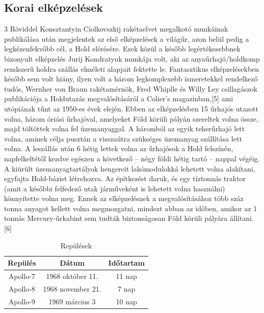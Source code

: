 \subsection{Korai elképzelések}
\begin{multicolss}{3} 
	Röviddel Konsztantyin Ciolkovszkij rakétaelvet megalkotó munkáinak publikálása után megjelentek az első elképzelések a világűr, azon belül pedig a legkézenfekvőbb cél, a Hold elérésére. Ezek közül a később legértékesebbnek bizonyult elképzelés Jurij Kondratyuk munkája volt, aki az 
	\columnbreak %
	anyaűrhajó/holdkomp rendszerű holdra szállás elméleti alapjait fektette le. Fantasztikus elképzelésekben később sem volt hiány, ilyen volt a három legkomplexebb ismeretekkel rendelkező tudós, Wernher von Braun rakétamérnök, Fred Whiplle és Willy Ley csillagászok publikációja a Holdutazás megvalósításáról a Colier's magazinban,[5] ami utópiának tűnt az 1950-es évek elején. Ebben az elképzelésben 15 űrhajós utazott volna, három óriási űrhajóval, amelyeket Föld körüli pályán szereltek volna össze, majd töltöttek volna fel üzemanyaggal. A háromból az egyik teherűrhajó lett volna, aminek célja pusztán a visszaútra szükséges üzemanyag szállítása lett volna. A leszállás után 6 hétig lettek volna az űrhajósok a Hold felszínén, napfelkeltétől kezdve egészen a következő – négy földi hétig tartó – nappal végéig. A kiürült üzemanyagtartályok hengereit lakómodulokká lehetett volna alakítani, egyfajta Hold-bázist létrehozva. Az építkezést daruk, és egy tíztonnás traktor (amit a későbbi felfedező utak járműveként is lehetett volna használni) könnyítette volna meg. Ennek az elképzelésnek a megvalósításához több száz tonna anyagot kellett volna megmozgatni, mindezt abban az időben, amikor az 1 tonnás Mercury-űrkabint sem tudták biztonságosan Föld körüli pályára állítani.[6]
\end{multicolss}


\begin{table}[H]
	\centering
	\begin{tabular}{ccc}
		\toprule
		Repülés & Dátum & Időtartam \\
		\midrule
		Apollo-7 & 1968 október 11. & 11 nap \\
		Apollo-8 & 1968 november 21. & 7 nap \\
		Apollo-9 & 1969 március 3 &  10 nap \\
		\bottomrule
	\end{tabular}
	\caption{Repülések}
	\label{tab:repulesek}
\end{table}

